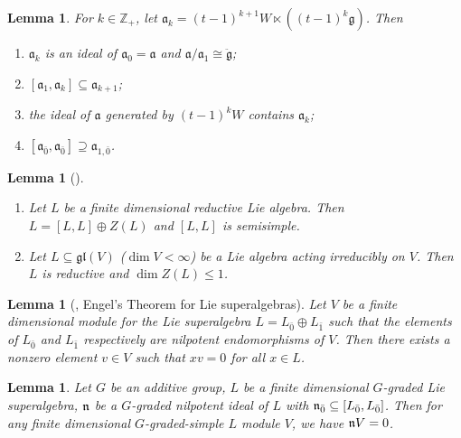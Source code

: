 \documentclass[1p]{elsarticle}
\numberwithin{equation}{section}
\def\gl{\mathfrak{gl}}
\def\fa{\mathfrak{a}}
\def\ddg{\ddot{\mathfrak{g}}}
\def\fg{\mathfrak{g}}
\def\fL{\mathfrak{L}}
\def\bZ{\mathbb{Z}}
\newtheorem{lemm}[theo]{Lemma}
\begin{document}
\begin{lemm}\label{ideal}
For $k\in\bZ_+$, let $\fa_k=(t-1)^{k+1}W\ltimes((t-1)^k \fg)$. Then
\begin{enumerate}
\item $\fa_k$ is an ideal of $\fa_0=\fa$ and $\fa/\fa_1\cong\ddg$;
\item $[\fa_1,\fa_k]\subseteq\fa_{k+1}$;
\item the ideal of $\fa$ generated by $(t-1)^kW$ contains $\fa_{k}$;
\item $[\fa_{\bar 0},\fa_{\bar 0}]\supseteq\fa_{1,\bar{0}}$.
\end{enumerate}
\end{lemm}

\begin{lemm}[{\cite[Proposition 19.1]{H}}]\label{reductive}
\begin{enumerate}
\item Let $L$ be a finite dimensional reductive Lie algebra. Then $L=[L,L]\oplus Z(L)$ and $[L,L]$ is semisimple.
\item Let $L\subseteq\gl(V)$ ($\dim V<\infty$) be a Lie algebra acting irreducibly on $V$. Then $L$ is reductive and $\dim Z(L)\leq1$.
\end{enumerate}
\end{lemm}


\begin{lemm}[{\cite[Theorem 2.1]{M}}, Engel's Theorem for Lie superalgebras]\label{Engel}
Let $V$ be a finite dimensional module for the Lie superalgebra $L=L_{\bar{0}}\oplus L_{\bar{1}}$ such that the elements of $L_{\bar{0}}$ and $L_{\bar{1}}$ respectively are nilpotent endomorphisms of $V$. Then there exists a nonzero element $v\in V$ such that $xv=0$ for all $x\in L$.
\end{lemm}

\begin{lemm} \label{graded-simple} Let $G$ be an additive group, $L$ be a finite dimensional $G$-graded Lie superalgebra, $\frak{n}$ be a $G$-graded nilpotent ideal of $L$ with $\frak{n}_{\bar 0}\subseteq [L_{\bar 0},L_{\bar 0}]$. Then for any finite dimensional $G$-graded-simple $L$ module $V$, we have $\frak{n} V=0$. \end{lemm}
\end{document}
